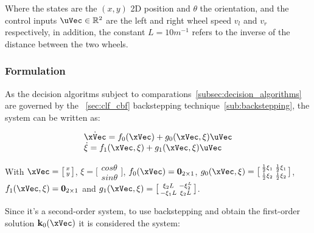 Where the states are the \((x,y)\) 2D position and \(\theta\) the orientation, and the control inputs \(\uVec \in \mathbb{R}^2\) are the left and right wheel speed \(v_l\) and \(v_r\) respectively, in addition, the constant \(L = 10 m^{-1}\) refers to the inverse of the distance between the two wheels. 

\subsubsection{ Formulation}
\label{subsubsec:Unicyle_CLF-CBF_Experiment_Setup}

As the decision algoritms subject to comparations~\ref{subsec:decision_algorithms} are governed by the ~\ref{sec:clf_cbf} backstepping technique~\ref{sub:backstepping}, the system can be written as:


\begin{equation}
    \begin{array}{l}
        \dot{\xVec} = f_0(\xVec) +  g_0(\xVec, \xi)\uVec \\
        \dot{\xi} = f_1(\xVec, \xi) + g_1(\xVec, \xi)\uVec
    \end{array}
    \label{eq:second_order_unicycle_model_backstepp}
\end{equation}

With \(\xVec =  \bigl[\begin{smallmatrix} x \\ y \end{smallmatrix}\bigr]\), \(\xi =  \bigl[\begin{smallmatrix} cos\theta \\ sin\theta \end{smallmatrix}\bigr]\), \(f_0(\xVec) = \mathbf{0}_{2 \times 1}\), \(g_0(\xVec, \xi) = \bigl[\begin{smallmatrix} \frac{1}{2}\xi_1 & \frac{1}{2}\xi_1 \\ \frac{1}{2}\xi_2 & \frac{1}{2}\xi_2 \end{smallmatrix}\bigr] \), \(f_1(\xVec, \xi) = \mathbf{0}_{2 \times 1}\) and \(g_1(\xVec, \xi) =  \bigl[\begin{smallmatrix} \xi_2L & -\xi_2^L \\ -\xi_1L &  \xi_2L \end{smallmatrix}\bigr]\). \par

Since it's a second-order system, to use backstepping and obtain the first-order solution \(\mathbf{k}_0(\xVec)\) it is considered the system:

